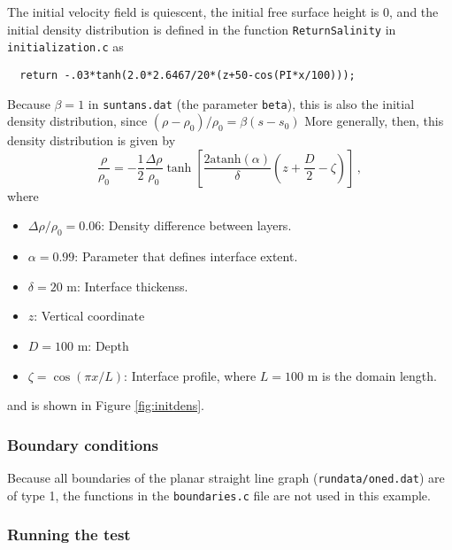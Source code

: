 \documentclass[12pt,oneside]{article}
\begin{document}
The initial velocity field is quiescent, the initial free surface height is 0,
and the initial density distribution is defined in the function \verb+ReturnSalinity+
in \verb+initialization.c+ as
\begin{verbatim}
  return -.03*tanh(2.0*2.6467/20*(z+50-cos(PI*x/100)));
\end{verbatim}
Because $\beta=1$ in \verb+suntans.dat+ (the parameter \verb+beta+), this is also the initial density 
distribution, since $(\rho-\rho_0)/\rho_0 = \beta(s-s_0)$ More generally, then, 
this density distribution is given by
\[
\frac{\rho}{\rho_0} = -\frac{1}{2}\frac{\Delta\rho}{\rho_0}
\tanh\left[\frac{2\mbox{atanh}(\alpha)}{\delta}\left(z+\frac{D}{2}-\zeta\right)\right]\,,
\]
where
\begin{itemize}
\item $\Delta\rho/\rho_0=0.06$: Density difference between layers.
\item $\alpha=0.99$: Parameter that defines interface extent.
\item $\delta=20$ m: Interface thickenss.
\item $z$: Vertical coordinate
\item $D=100$ m: Depth
\item $\zeta = \cos(\pi x/L)$: Interface profile, where $L=100$ m is the domain length.
\end{itemize}
and is shown in Figure \ref{fig:initdens}. 

\subsubsection{Boundary conditions}

Because all boundaries of the planar
straight line graph (\verb+rundata/oned.dat+) are of type 1, the functions in the \verb+boundaries.c+ file are
not used in this example.

\subsubsection{Running the test}
\end{document}
